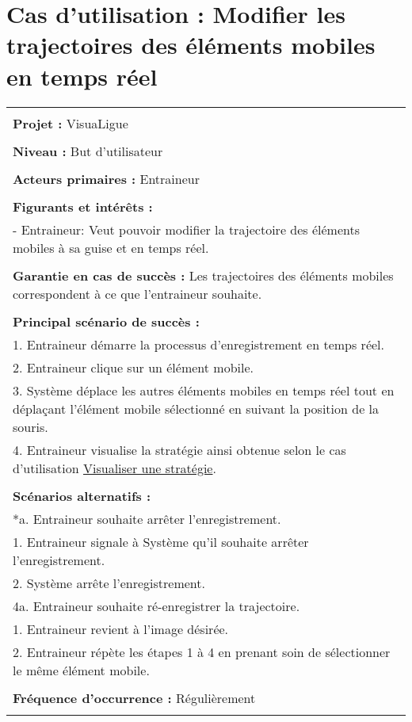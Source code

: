 \section{Cas d'utilisation : Modifier les trajectoires des éléments mobiles en temps réel}
\begin{longtable}{|p{16cm}|}
	\hline
	\\
	\textbf{Projet :} VisuaLigue\\
	\\
	\textbf{Niveau :} But d'utilisateur\\
	\\
	\textbf{Acteurs primaires :} Entraineur\\
	\\
	\textbf{Figurants et intérêts :} \\
	- Entraineur: Veut pouvoir modifier la trajectoire des éléments mobiles à sa guise et en temps réel.\\
	\\
	\textbf{Garantie en cas de succès :} Les trajectoires des éléments mobiles correspondent à ce que l'entraineur souhaite.\\
	\\
	\textbf{Principal scénario de succès :}\\
	1. Entraineur démarre la processus d'enregistrement en temps réel.\\
	2. Entraineur clique sur un élément mobile.\\
	3. Système déplace les autres éléments mobiles en temps réel tout en déplaçant l'élément mobile sélectionné en suivant la position de la souris.\\
	4. Entraineur visualise la stratégie ainsi obtenue selon le cas d'utilisation \underline{Visualiser une stratégie}.\\
	\\
	\textbf{Scénarios alternatifs :}\\
	*a. Entraineur souhaite arrêter l'enregistrement.\\
	\hspace{0.5cm}1. Entraineur signale à Système qu'il souhaite arrêter l'enregistrement.\\
	\hspace{0.5cm}2. Système arrête l'enregistrement.\\
	4a. Entraineur souhaite ré-enregistrer la trajectoire.\\
	\hspace{0.5cm}1. Entraineur revient à l'image désirée.\\
	\hspace{0.5cm}2. Entraineur répète les étapes 1 à 4 en prenant soin de sélectionner le même élément mobile.\\
	\\
	\textbf{Fréquence d'occurrence :} Régulièrement\\
	\\
	\hline
\end{longtable}


